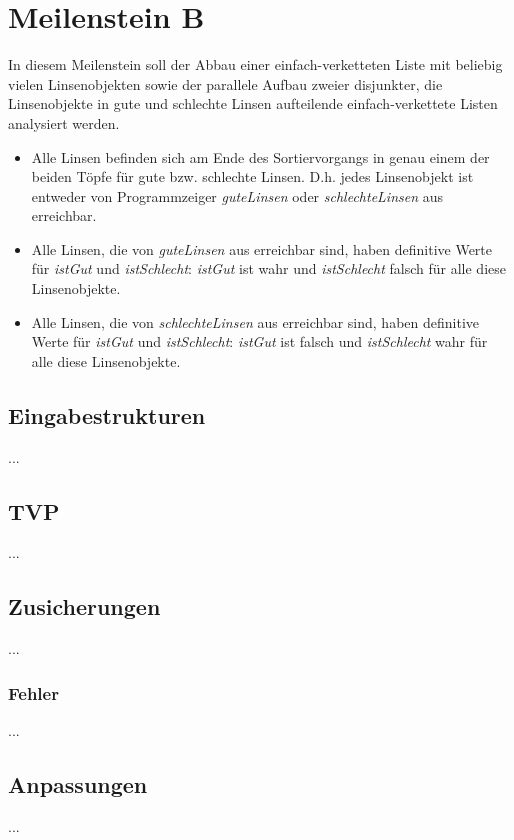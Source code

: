 \section{Meilenstein B}
In diesem Meilenstein soll der Abbau einer einfach-verketteten Liste mit beliebig vielen Linsenobjekten sowie der parallele Aufbau zweier disjunkter, die Linsenobjekte in gute und schlechte Linsen aufteilende einfach-verkettete Listen analysiert werden.
\begin{itemize}
	\item Alle Linsen befinden sich am Ende des Sortiervorgangs in genau einem der beiden Töpfe für gute bzw. schlechte Linsen. D.h. jedes Linsenobjekt ist entweder von Programmzeiger \emph{guteLinsen} oder \emph{schlechteLinsen} aus erreichbar.
	\item Alle Linsen, die von \emph{guteLinsen} aus erreichbar sind, haben definitive Werte für \emph{istGut} und \emph{istSchlecht}: \emph{istGut} ist wahr und \emph{istSchlecht} falsch für alle diese Linsenobjekte.
	\item Alle Linsen, die von \emph{schlechteLinsen} aus erreichbar sind, haben definitive Werte für \emph{istGut} und \emph{istSchlecht}: \emph{istGut} ist falsch und \emph{istSchlecht} wahr für alle diese Linsenobjekte.
\end{itemize}


\subsection{Eingabestrukturen}
...


\subsection{TVP}
...


\subsection{Zusicherungen}
...


\subsubsection{Fehler}
...


\subsection{Anpassungen}
...


